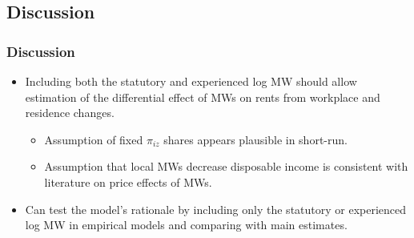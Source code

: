 \subsection{Discussion}
\begin{frame}
	\frametitle{Discussion}
	
	\begin{itemize}
		\item Including both the statutory and experienced log MW should allow estimation 
		of the differential effect of MWs on rents from workplace and residence changes.
		\vspace{1mm}
		\begin{itemize}
			\item Assumption of fixed $\pi_{i z}$ shares appears plausible in short-run.
			
			{\color{gray} \footnotesize \parencite{MonteEtAl2018, CegnizEtAl2019, 
			PerezPerez2020}} 
			
			\vspace{1mm}
			\item Assumption that local MWs decrease disposable income is consistent with 
			literature on price effects of MWs.
			
			{\color{gray} \footnotesize \parencite{Allegretto2018, Leung2020}}
		\end{itemize}
		
		\vspace{2.5mm}
		\item Can test the model's rationale by including only the statutory or 
		experienced log MW in empirical models and comparing with main estimates.
	\end{itemize}
	
\end{frame}


